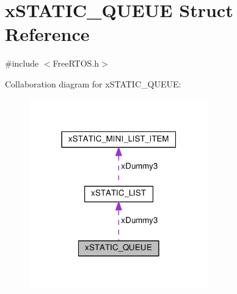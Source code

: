 \hypertarget{structxSTATIC__QUEUE}{}\section{x\+S\+T\+A\+T\+I\+C\+\_\+\+Q\+U\+E\+UE Struct Reference}
\label{structxSTATIC__QUEUE}


{\ttfamily \#include $<$Free\+R\+T\+O\+S.\+h$>$}



Collaboration diagram for x\+S\+T\+A\+T\+I\+C\+\_\+\+Q\+U\+E\+UE\+:\nopagebreak
\begin{figure}[H]
\begin{center}
\leavevmode
\includegraphics[width=220pt]{d7/d4b/structxSTATIC__QUEUE__coll__graph}
\end{center}
\end{figure}

